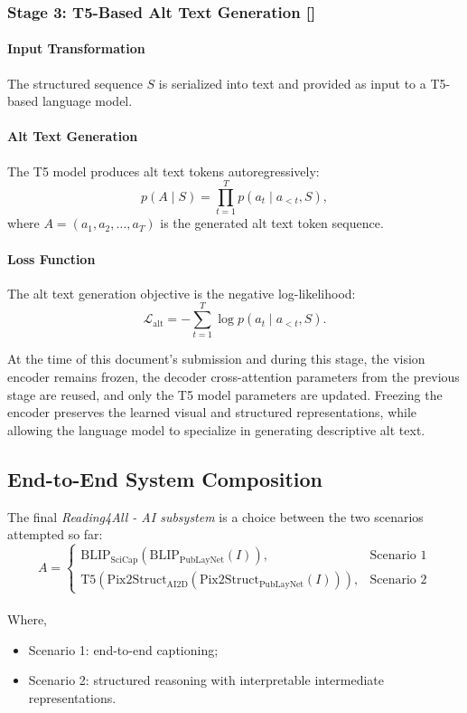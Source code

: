 \documentclass[12pt, titlepage]{article}
\begin{document}
\subsubsection{Stage 3: T5-Based Alt Text Generation [\cite{2020t5}]}

\paragraph{Input Transformation}
The structured sequence $S$ is serialized into text and provided as input to a T5-based language model.

\paragraph{Alt Text Generation}
The T5 model produces alt text tokens autoregressively:
\[
p(A \mid S) = \prod_{t=1}^{T} p(a_t \mid a_{<t}, S),
\]
where $A = (a_1, a_2, \dots, a_T)$ is the generated alt text token sequence.

\paragraph{Loss Function}
The alt text generation objective is the negative log-likelihood:
\[
\mathcal{L}_{\text{alt}} =
- \sum_{t=1}^{T} \log p(a_t \mid a_{<t}, S).
\]

At the time of this document's submission and during this stage, the vision encoder remains frozen, the decoder cross-attention parameters from the previous stage are reused, and only the T5 model parameters are updated. Freezing the encoder preserves the learned visual and structured representations, while allowing the language model to specialize in generating descriptive alt text.

\subsection{End-to-End System Composition}

The final \textit{Reading4All - AI subsystem} is a choice between the two scenarios attempted so far:
\[
A =
\begin{cases}
\text{BLIP}_{\text{SciCap}}(\text{BLIP}_{\text{PubLayNet}}(I)), & \text{Scenario 1} \\
\text{T5}(\text{Pix2Struct}_{\text{AI2D}}(\text{Pix2Struct}_{\text{PubLayNet}}(I))), & \text{Scenario 2}
\end{cases}
\]\\
Where,
\begin{itemize}
  \item Scenario 1: end-to-end captioning;
  \item Scenario 2: structured reasoning with interpretable intermediate representations.
\end{itemize}  
\end{document}
